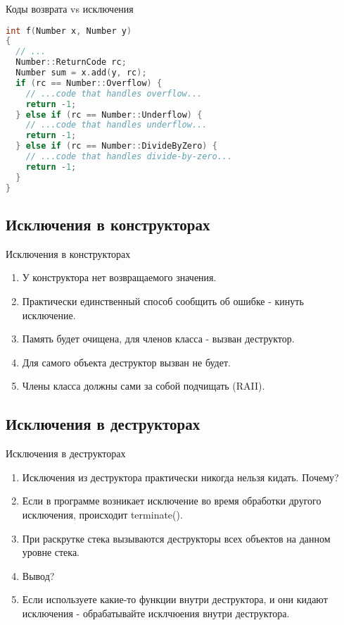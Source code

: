 \documentclass[10pt]{beamer}
\begin{document}
\begin{frame}[fragile]{Коды возврата vs исключения}
\begin{lstlisting}[language=C++]
int f(Number x, Number y)
{
  // ...
  Number::ReturnCode rc;
  Number sum = x.add(y, rc);
  if (rc == Number::Overflow) {
    // ...code that handles overflow...
    return -1;
  } else if (rc == Number::Underflow) {
    // ...code that handles underflow...
    return -1;
  } else if (rc == Number::DivideByZero) {
    // ...code that handles divide-by-zero...
    return -1;
  }
}
\end{lstlisting}
\end{frame}

\subsection{Исключения в конструкторах}
\begin{frame}[fragile]{Исключения в конструкторах}
\begin{enumerate}
    \item У конструктора нет возвращаемого значения.
    \item Практически единственный способ сообщить об ошибке - кинуть исключение.
    \item Память будет очищена, для членов класса - вызван деструктор.
    \item Для самого объекта деструктор вызван не будет.
    \item Члены класса должны сами за собой подчищать (RAII).
\end{enumerate}
\end{frame}

\subsection{Исключения в деструкторах}
\begin{frame}[fragile]{Исключения в деструкторах}
\begin{enumerate}
    \item Исключения из деструктора практически никогда нельзя кидать. Почему?
    \item Если в программе возникает исключение во время обработки другого исключения, происходит terminate().
    \item При раскрутке стека вызываются деструкторы всех объектов на данном уровне стека.
    \item Вывод?
    \item Если используете какие-то функции внутри деструктора, и они кидают исключения - обрабатывайте исклчюения внутри деструктора.
\end{enumerate}
\end{frame}
\end{document}
